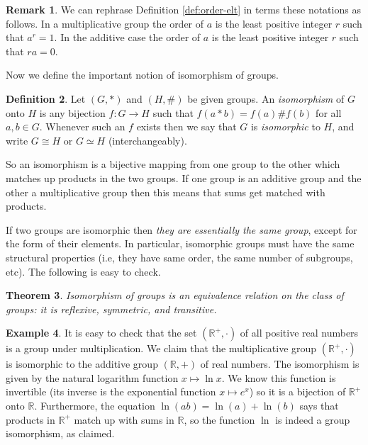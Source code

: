 \documentclass[11pt]{article}
\newtheorem{thm}{Theorem}[section]
\theoremstyle{definition}
\newtheorem{defn}[thm]{Definition}
\newtheorem{example}[thm]{Example}
\newtheorem{rmk}[thm]{Remark}
\newcommand{\R}{\mathbb{R}} %
\begin{document}
\begin{rmk}
We can rephrase Definition \ref{def:order-elt} in terms these
notations as follows.  In a multiplicative group the order of $a$ is
the least positive integer $r$ such that $a^r = 1$. In the additive
case the order of $a$ is the least positive integer $r$ such that $ra
= 0$.
\end{rmk}

Now we define the important notion of isomorphism of groups. 

\begin{defn}
  Let $(G,*)$ and $(H,\#)$ be given groups. An \emph{isomorphism} of
  $G$ onto $H$ is any bijection $f \colon G \to H$ such that $f(a*b) =
  f(a)\#f(b)$ for all $a,b \in G$. Whenever such an $f$ exists then we
  say that $G$ is \emph{isomorphic} to $H$, and write $G \cong H$ or
  $G \simeq H$ (interchangeably).
\end{defn}

So an isomorphism is a bijective mapping from one group to the other
which matches up products in the two groups. If one group is an
additive group and the other a multiplicative group then this means
that sums get matched with products.

If two groups are isomorphic then {\em they are essentially the same
  group}, except for the form of their elements. In particular,
isomorphic groups must have the same structural properties (i.e, they
have same order, the same number of subgroups, etc). The following is
easy to check.


\begin{thm}\label{thm:iso}
  Isomorphism of groups is an equivalence relation on the class of
  groups: it is reflexive, symmetric, and transitive.
\end{thm}

\begin{example}\index{R@$\R^+$}
It is easy to check that the set $(\R^+, \cdot)$ of all positive real
numbers is a group under multiplication. We claim that the
multiplicative group $(\R^+, \cdot)$ is isomorphic to the additive
group $(\R, +)$ of real numbers. The isomorphism is given by the
natural logarithm function $x \mapsto \ln x$. We know this function is
invertible (its inverse is the exponential function $x \mapsto e^x$)
so it is a bijection of $\R^+$ onto $\R$. Furthermore, the equation
$\ln(ab) = \ln(a) + \ln(b)$ says that products in $\R^+$ match up with
sums in $\R$, so the function $\ln$ is indeed a group isomorphism, as
claimed.
\end{example}
\end{document}
